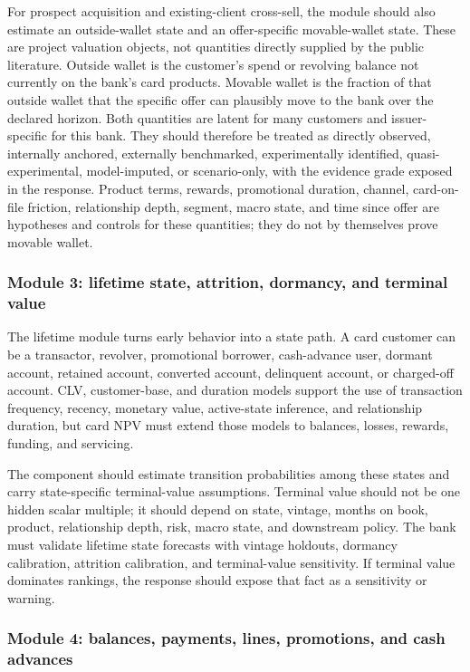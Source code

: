 \documentclass[11pt]{article}
\newcommand{\1}{\mathbf{1}}
\begin{document}
For prospect acquisition and existing-client cross-sell, the module should also
estimate an outside-wallet state and an offer-specific movable-wallet state.
These are project valuation objects, not quantities directly supplied by the
public literature. Outside wallet is the customer's spend or revolving balance
not currently on the bank's card products. Movable wallet is the fraction of
that outside wallet that the specific offer can plausibly move to the bank over
the declared horizon. Both quantities are latent for many customers and
issuer-specific for this bank. They should therefore be treated as directly
observed, internally anchored, externally benchmarked, experimentally
identified, quasi-experimental, model-imputed, or scenario-only, with the
evidence grade exposed in the response. Product terms, rewards, promotional
duration, channel, card-on-file friction, relationship depth, segment, macro
state, and time since offer are hypotheses and controls for these quantities;
they do not by themselves prove movable wallet.

\subsubsection{Module 3: lifetime state, attrition, dormancy, and terminal value}
\label{subsec:module-lifetime}

The lifetime module turns early behavior into a state path. A card customer
can be a transactor, revolver, promotional borrower, cash-advance user,
dormant account, retained account, converted account, delinquent account, or
charged-off account. CLV, customer-base, and duration models support the use
of transaction frequency, recency, monetary value, active-state inference, and
relationship duration, but card NPV must extend those models to balances,
losses, rewards, funding, and servicing.

The component should estimate transition probabilities among these states and
carry state-specific terminal-value assumptions. Terminal value should not be
one hidden scalar multiple; it should depend on state, vintage, months on book,
product, relationship depth, risk, macro state, and downstream policy. The
bank must validate lifetime state forecasts with vintage holdouts, dormancy
calibration, attrition calibration, and terminal-value sensitivity. If terminal
value dominates rankings, the response should expose that fact as a sensitivity
or warning.

\subsubsection{Module 4: balances, payments, lines, promotions, and cash advances}
\label{subsec:module-balances}
\end{document}
